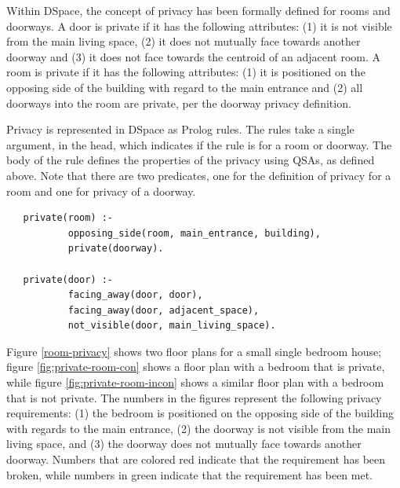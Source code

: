 \documentclass[12pt]{ucthesis}
\begin{document}
Within DSpace, the concept of privacy has been formally defined for rooms and doorways. A door is private if it has the following attributes: (1) it is not visible from the main living space, (2) it does not mutually face towards another doorway and (3) it does not face towards the centroid of an adjacent room. A room is private if it has the following attributes: (1) it is positioned on the opposing side of the building with regard to the main entrance and (2) all doorways into the room are private, per the doorway privacy definition.
 
Privacy is represented in DSpace as Prolog rules. The rules take a single argument, in the head, which indicates if the rule is for a room or doorway. The body of the rule defines the properties of the privacy using QSAs, as defined above. Note that there are two predicates, one for the definition of privacy for a room and one for privacy of a doorway.  

\begin{verbatim}
   private(room) :-  
           opposing_side(room, main_entrance, building), 
           private(doorway).
                     
   private(door) :- 
           facing_away(door, door),
           facing_away(door, adjacent_space),
           not_visible(door, main_living_space). 
\end{verbatim}

Figure \ref{room-privacy} shows two floor plans for a small single bedroom house; figure \ref{fig:private-room-con} shows a floor plan with a bedroom that is  private, while figure \ref{fig:private-room-incon} shows a similar floor plan with a bedroom that is not private. The numbers in the figures represent the following privacy requirements: (1) the bedroom is positioned on the opposing side of the building with regards to the main entrance, (2) the doorway is not visible from the main living space, and (3) the doorway does not mutually face towards another doorway. Numbers that are colored red indicate that the requirement has been broken, while numbers in green indicate that the requirement has been met.
\end{document}
